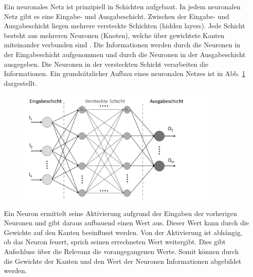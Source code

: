 Ein neuronales Netz ist prinzipiell in Schichten aufgebaut.
In jedem neuronalen Netz gibt es eine Eingabe- und Ausgabeschicht.
Zwischen der Eingabe- und Ausgabeschicht liegen mehrere versteckte Schichten (hidden layers).
Jede Schicht besteht aus mehreren Neuronen (Knoten), welche über gewichtete Kanten miteinander verbunden sind \autocite[vgl.][S. 26]{sonnet_neuronale_2022}.
Die Informationen werden durch die Neuronen in der Eingabeschicht aufgenommen und durch die Neuronen in der Ausgabeschicht ausgegeben.
Die Neuronen in der versteckten Schicht verarbeiten die Informationen.
Ein grundsätzlicher Aufbau eines neuronalen Netzes ist in Abb. \ref{fig:StructureNN} dargestellt.
\begin{figure}[H]
    \centering
    \includegraphics[width=0.9\textwidth]{images/structure_NN.png}
    \label{fig:StructureNN}
\end{figure}\noindent
Ein Neuron ermittelt seine Aktivierung aufgrund der Eingaben der vorherigen Neuronen und gibt daraus aufbauend einen Wert aus.
Dieser Wert kann durch die Gewichte auf den Kanten beeinflusst werden.
Von der Aktivierung ist abhängig, ob das Neuron feuert, sprich seinen errechneten Wert weitergibt.
Dies gibt Aufschluss über die Relevanz die vorangegangenen Werte.
Somit können durch die Gewichte der Kanten und den Wert der Neuronen Informationen abgebildet werden.
\autocite[vgl.][S. 27]{sonnet_neuronale_2022}

